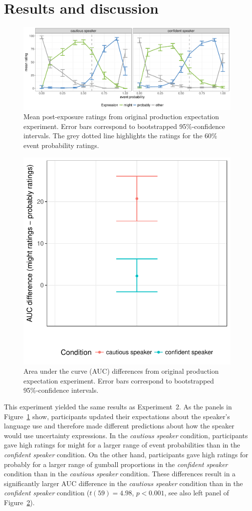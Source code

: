 \section{Results and discussion}

\begin{figure}
\includegraphics[width=\textwidth]{plots/fig-E1-exp-1-ratings.pdf}
\caption{Mean post-exposure ratings from original production expectation experiment. Error bars correspond to bootstrapped 95\%-confidence intervals.  The grey dotted line highlights the ratings for the 60\% event probability ratings.  \label{fig:adaptation-results-prod-orig}}
\end{figure}

\begin{figure}
\center
\includegraphics[width=.4\textwidth]{plots/fig-E2-exp-1-auc-orig.pdf}
\caption{Area under the curve (AUC) differences from original production expectation experiment. Error bars correspond to bootstrapped 95\%-confidence intervals.  \label{fig:adaptation-auc-prod-orig}}
\end{figure}

This experiment yielded the same results as Experiment~2. As the panels in Figure~\ref{fig:adaptation-results-prod-orig} show, participants updated their expectations about the speaker's language use and therefore made different predictions about how the speaker would use uncertainty expressions. In the \emph{cautious speaker} condition, participants gave high ratings for {\sc might} for a larger range of event probabilities than in the \emph{confident speaker} condition. On the other hand, participants gave high ratings for {\sc probably} for a larger range of gumball proportions in the \emph{confident speaker} condition than in the \emph{cautious speaker} condition. These differences result in a significantly larger AUC difference in the \emph{cautious speaker} condition than in the \emph{confident speaker} condition ($t(59) = 4.98$, $p < 0.001$, see also left panel of Figure~\ref{fig:adaptation-auc-prod-orig}).

